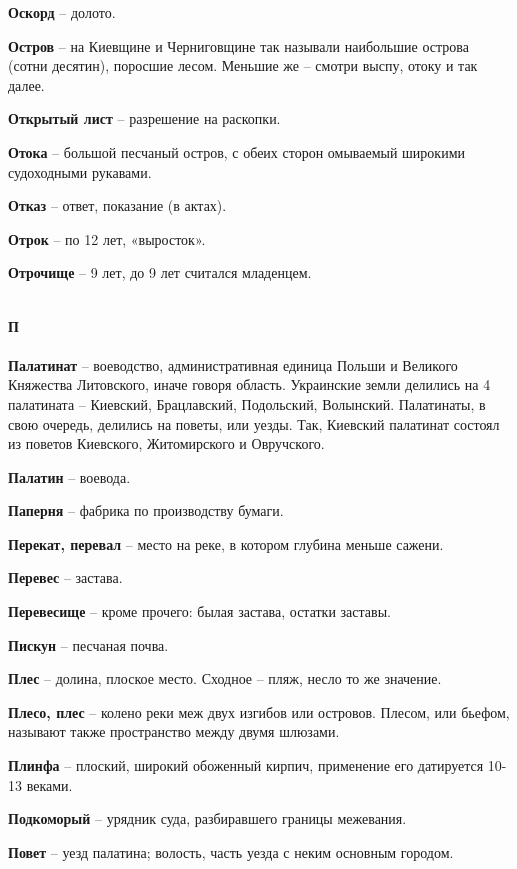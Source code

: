 \begin{multicols}{2}
\textbf{Оскорд} – долото.

\textbf{Остров} – на Киевщине и Черниговщине так называли наибольшие острова (сотни десятин), поросшие лесом. Меньшие же – смотри выспу, отоку и так далее.

\textbf{Открытый лист} – разрешение на раскопки.

\textbf{Отока} – большой песчаный остров, с обеих сторон омываемый широкими судоходными рукавами.

\textbf{Отказ} – ответ, показание (в актах).

\textbf{Отрок} – по 12 лет, «выросток».

\textbf{Отрочище} – 9 лет, до 9 лет считался младенцем.

\mbox{ }\\
\textbf{П\\}
\mbox{ }\\

\textbf{Палатинат} – воеводство, административная единица Польши и Великого Княжества Литовского, иначе говоря область. Украинские земли делились на 4 палатината – Киевский, Брацлавский, Подольский, Волынский. Палатинаты, в свою очередь, делились на поветы, или уезды. Так, Киевский палатинат состоял из поветов Киевского, Житомирского и Овручского.

\textbf{Палатин} – воевода.


\textbf{Паперня} – фабрика по производству бумаги.

\textbf{Перекат, перевал} – место на реке, в котором глубина меньше сажени.

\textbf{Перевес} – застава.

\textbf{Перевесище} – кроме прочего: былая застава, остатки заставы.

\textbf{Пискун} – песчаная почва.

\textbf{Плес} – долина, плоское место. Сходное – пляж, несло то же значение.

\textbf{Плесо, плес} – колено реки меж двух изгибов или островов. Плесом, или бьефом, называют также пространство между двумя шлюзами.

\textbf{Плинфа} – плоский, широкий обоженный кирпич, применение его датируется 10-13 веками.

\textbf{Подкоморый} – урядник суда, разбиравшего границы межевания.

\textbf{Повет} – уезд палатина; волость, часть уезда с неким основным городом.


\end{multicols}
